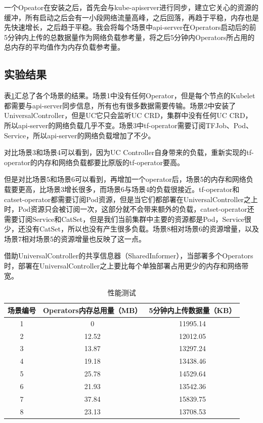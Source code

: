 \documentclass[macfonts,master]{njuthesis}
\begin{document}
一个Opeator在安装之后，首先会与kube-apiserver进行同步，建立它关心的资源的缓冲，所有启动之后会有一小段网络流量高峰，之后回落，再趋于平稳，内存也是先快速增长，之后趋于平稳。我会将每个场景中api-server在Operators启动后的前5分钟内上传的总数据量作为网络负载参考量，将之后5分钟内Operators所占用的总内存的平均值作为内存负载参考量。

\subsection{实验结果}
表\ref{table:test}汇总了各个场景的结果。场景1中没有任何Operator，但是每个节点的Kubelet都需要与api-server同步信息，所有也有很多数据需要传输。场景2中安装了UniversalController，但是UC它只会监听UC CRD，集群中没有任何UC CRD，所以api-server的网络负载几乎不变。场景3中tf-operator需要订阅TFJob、Pod、Service，所以api-server的网络负载增加了不少。

对比场景3和场景4可以看到，因为UC Controller自身带来的负载，重新实现的tf-operator的内存和网络负载都要比原版的tf-operator要高。

但是对比场景5和场景6可以看到，再增加一个operator后，场景5的内存和网络负载要更高，比场景3增长很多，而场景6与场景4的负载很接近。tf-operator和catset-operator都需要订阅Pod资源，但是当它们都部署在UniversalController之上时，Pod资源只会被订阅一次，这部分就不会带来额外的负载，catset-operator还需要订阅Service和CatSet，但是我们当前集群中主要的资源都是Pod，Service很少，还没有CatSet，所以也没有产生很多负载。场景8相对场景6的资源增量，以及场景7相对场景5的资源增量也反映了这一点。

借助UniversalController的共享信息器（SharedInformer），当部署多个Operators时，部署在UniversalController之上要比每个单独部署占用更少的内存和网络带宽。
\begin{table}
  \centering
  \begin{tabular}{ccc}
    \toprule
    \textbf{场景编号} & \textbf{Operators内存总用量（MB）} & \textbf{5分钟内上传数据量（KB）} \\
    \midrule
    1  & 0 & 11995.14 \\
    2  & 12.52  &  12012.05 \\
    3  & 13.87  & 13297.24 \\
    4  & 19.18 &  13438.46 \\
    5  & 25.78  & 14529.64 \\
    6  & 21.93  & 13542.36 \\
    7  & 37.84  & 15839.75 \\
    8  & 23.13  & 13708.53 \\
    \bottomrule
  \end{tabular}
  \caption{性能测试}\label{table:test}
\end{table}
\end{document}
